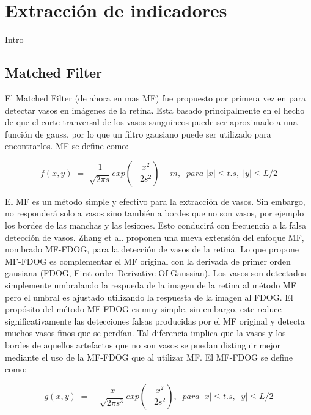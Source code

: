 \section{Extracci\'on de indicadores}

Intro

\subsection{Matched Filter}

El Matched Filter (de ahora en mas MF) fue propuesto por primera vez en \cite{chaudhuri1989detection} para detectar vasos en im\'agenes de la retina. Esta basado principalmente en el hecho de que el corte tranversal de los vasos sanguineos puede ser aproximado a una funci\'on de gauss, por lo que un filtro gausiano puede ser utilizado para encontrarlos. MF se define como: 

\begin{displaymath}
f(x,y)\;=\;\frac1{\sqrt{2\pi s}}exp(-\frac{x^2}{2s^2})-m,\;\;para\;\left|x\right|\leq t.s,\;\left|y\right|\leq L/2
\end{displaymath}

El MF es un m\'etodo simple y efectivo para  la extracci\'on de vasos. Sin embargo, no responder\'a solo a vasos sino tambi\'en a bordes que no son vasos, por ejemplo los bordes de las manchas y las lesiones. Esto conducir\'a con frecuencia a la falsa detecci\'on de vasos. Zhang et al. \cite{zhang2010retinal} proponen una nueva extensi\'on del enfoque MF, nombrado MF-FDOG, para la detección de vasos de la retina. Lo que propone MF-FDOG es complementar el MF original con la derivada de primer orden gausiana (FDOG, First-order Derivative Of Gaussian). Los vasos son detectados simplemente umbralando la respueda de la imagen de la retina al m\'etodo MF pero el umbral es ajustado utilizando la respuesta de la imagen al FDOG. El prop\'osito del m\'etodo  MF-FDOG es muy simple, sin embargo, este reduce significativamente las detecciones falsas producidas por el MF original y detecta muchos vasos finos que se perd\'ian.  Tal diferencia implica que la vasos y los bordes de aquellos artefactos que no son vasos se puedan distinguir mejor mediante el uso de la MF-FDOG que al utilizar MF. El MF-FDOG se define como:

\begin{displaymath}
g(x,y)\;=-\;\frac x{\sqrt{2\pi s^3}}exp(-\frac{x^2}{2s^2}),\;\;para\;\left|x\right|\leq t.s,\;\left|y\right|\leq L/2
\end{displaymath}


